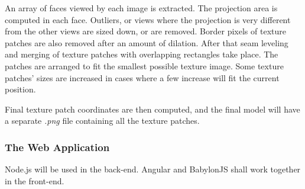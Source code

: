 \documentclass[journal]{./IEEE/IEEEtran}
\begin{document}
    An array of faces viewed by each image is extracted. The projection area is computed in each face. Outliers, or views where the projection is very different from the other views are sized down, or are removed. Border pixels of texture patches are also removed after an amount of dilation. After that seam leveling and merging of texture patches with overlapping rectangles take place. The patches are arranged to fit the smallest possible texture image. Some texture patches' sizes are increased in cases where a few increase will fit the current position.
    
    Final texture patch coordinates are then computed, and the final model will have a separate \textit{.png} file containing all the texture patches. 
    
    \subsubsection*{The Web Application}
    Node.js will be used in the back-end. Angular and BabylonJS shall work together in the front-end.




\end{document}
